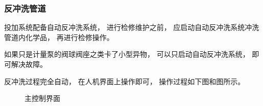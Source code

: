 \documentclass[UTF8,a4paper,12pt,titlepage]{ctexart}
\begin{document}
        \subsubsection{反冲洗管道}
            投加系统配备自动反冲洗系统，
            进行检修维护之前，
            应启动自动反冲洗系统冲洗管道内化学品，
            再进行检修操作。
            \par  如果只是计量泵的阀球阀座之类卡了小型异物，
            可以只启动自动反冲洗系统，
            即可解决故障。
            \par 反冲洗过程完全自动，
            在人机界面上操作即可，
            操作过程如下图和图所示。

        \newpage

            \begin{figure}[h]
                \centering
                \caption{主控制界面}

                \vspace{6pt}


\end{figure}
\end{document}
